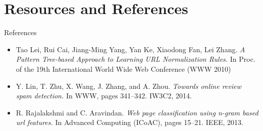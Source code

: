 \documentclass[presentation]{beamer}
\begin{document}
\section{Resources and References}
\label{sec:orgheadline29}
\begin{frame}[label={sec:orgheadline28}]{References}
\begin{itemize}
\item Tao Lei, Rui Cai, Jiang-Ming Yang, Yan Ke, Xiaodong Fan, Lei Zhang. \emph{A Pattern Tree-based Approach to Learning URL Normalization Rules.} In Proc. of the 19th International World Wide Web Conference (WWW 2010)

\item Y. Lin, T. Zhu, X. Wang, J. Zhang, and A. Zhou. \emph{Towards online review spam detection.} In WWW, pages 341–342. IW3C2, 2014.

\item R. Rajalakshmi and C. Aravindan. \emph{Web page classification using n-gram based url features.} In Advanced Computing (ICoAC), pages 15–21. IEEE, 2013.
\end{itemize}
\end{frame}
\end{document}

